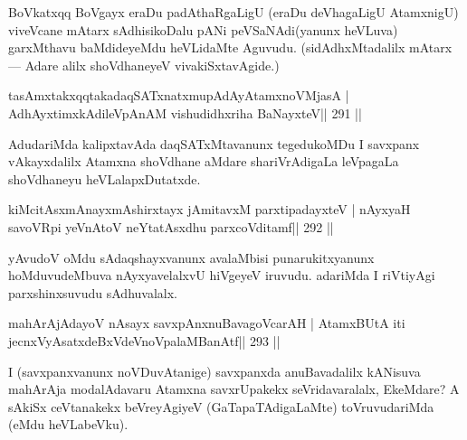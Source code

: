 \begin{artha}
BoVkatxqq BoVgayx eraDu padAthaRgaLigU (eraDu deVhagaLigU AtamxnigU) viveVcane mAtarx sAdhisikoDalu pANi peVSaNAdi(yanunx heVLuva) garxMthavu baMdideyeMdu heVLidaMte Aguvudu. (sidAdhxMtadalilx mAtarx  {\rm ---}  Adare alilx shoVdhaneyeV vivakiSxtavAgide.)
\end{artha}

\begin{shl}
\footnotemark[3]tasAmxtakxqqtakadaqSATxnatxmupAdAyA\s\s tamxnoV\s MjasA |
AdhAyxtimxkAdileVpAnAM vishudidhxriha BaNayxteV\hfill || 291 ||
\end{shl}

\begin{artha}
AdudariMda kalipxtavAda daqSATxMtavanunx tegedukoMDu I savxpanx vAkayxdalilx Atamxna shoVdhane aMdare shariVrAdigaLa leVpagaLa shoVdhaneyu heVLalapxDutatxde.
\end{artha}


\begin{shl}
kiMcitAsxmAnayxmAshirxtayx jAmitavxM parxtipadayxteV |
nAyxyaH savoVR\s pi yeVnAtoV neYtatAsxdhu parxcoVditamf\hfill || 292 ||
\end{shl}

\begin{artha}
yAvudoV oMdu sAdaqshayxvanunx avalaMbisi punarukitxyanunx  hoMduvu\-deMbuva nAyxyavelalxvU hiVgeyeV iruvudu. adariMda I riVtiyAgi parxshinxsuvudu sAdhuvalalx.
\end{artha}


\begin{shl}
mahArAjAdayoV nAsayx savxpAnxnuBavagoVcarAH |
AtamxBUtA iti jecnxVyAsatxdeBxVdeVnoVpalaMBanAtf\hfill || 293 ||
\end{shl}

\begin{artha}
I (savxpanxvanunx noVDuvAtanige) savxpanxda anuBavadalilx kANisuva mahArAja modalAdavaru Atamxna savxrUpakekx seVridavaralalx, EkeMdare? A sAkiSx ceVtanakekx beVreyAgiyeV (GaTapaTAdigaLaMte) toVruvudariMda (eMdu heVLabeVku).
\end{artha}

